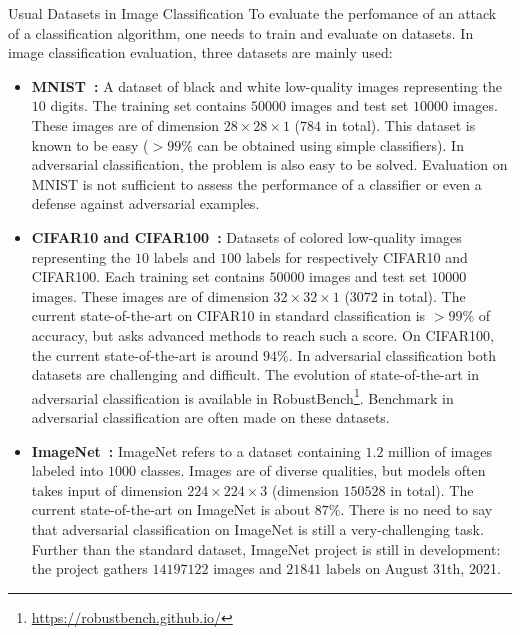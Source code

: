 {Usual Datasets in Image Classification}
To evaluate the perfomance of an attack of a classification algorithm, one needs to train and evaluate on datasets. In image classification evaluation, three datasets are mainly used:
\begin{itemize}
    \item \textbf{MNIST~\citep{lecun1998mnist}:} A dataset of black and white low-quality images representing the $10$ digits. The training set contains $50000$ images and test set $10000$ images. These images are of dimension $28\times28\times 1$ ($784$ in total). This dataset is known to be easy ($>99\%$ can be obtained using simple classifiers). In adversarial classification, the problem is also easy to be solved. Evaluation on MNIST is not sufficient to assess the performance of a classifier or even a defense against adversarial examples.
    \item \textbf{CIFAR10 and CIFAR100~\citep{krizhevsky2009learning}:} Datasets of colored low-quality images representing the $10$ labels and $100$ labels for respectively CIFAR10 and CIFAR100. Each training set contains $50000$ images and test set $10000$ images. These images are of dimension $32\times32\times 1$ ($3072$ in total). The current state-of-the-art on CIFAR10 in standard classification is $>99\%$ of accuracy, but asks advanced methods to reach such a score. On CIFAR100, the current state-of-the-art is around $94\%$. In adversarial classification both datasets are challenging and difficult. The evolution of state-of-the-art in adversarial classification is available in RobustBench\footnote{\url{https://robustbench.github.io/}}. Benchmark in adversarial classification are often made on these datasets.
    \item \textbf{ImageNet~\citep{imagenet_cvpr09}:} ImageNet refers to a dataset containing $1.2$ million of images labeled into $1000$ classes. Images are of diverse qualities, but models often takes input of dimension $224\times224\times 3$ (dimension $150528$ in total). The current state-of-the-art on ImageNet is about $87\%$. There is no need to say that adversarial classification on ImageNet is still a very-challenging task. Further than the standard dataset, ImageNet project is still in development: the project gathers $14197122$ images and $21841$ labels on August 31th, 2021.   


\end{itemize}


